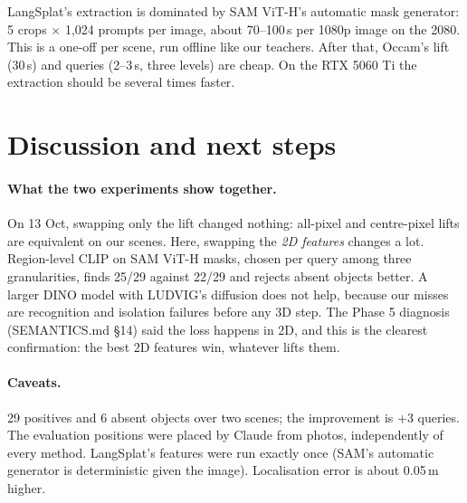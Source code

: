 \documentclass[11pt,a4paper]{article}
\begin{document}
\noindent LangSplat's extraction is dominated by SAM ViT-H's automatic mask generator: 5 crops $\times$ 1,024 prompts per
image, about 70--100\,s per 1080p image on the 2080. This is a one-off per scene, run offline like our teachers. After
that, Occam's lift (30\,s) and queries (2--3\,s, three levels) are cheap. On the RTX 5060 Ti the extraction should be
several times faster.

\section{Discussion and next steps}
\paragraph{What the two experiments show together.} On 13 Oct, swapping only the lift changed nothing: all-pixel and
centre-pixel lifts are equivalent on our scenes. Here, swapping the \emph{2D features} changes a lot. Region-level CLIP on
SAM ViT-H masks, chosen per query among three granularities, finds 25/29 against 22/29 and rejects absent objects better.
A larger DINO model with LUDVIG's diffusion does not help, because our misses are recognition and isolation failures
before any 3D step. The Phase 5 diagnosis (SEMANTICS.md \S14) said the loss happens in 2D, and this is the clearest
confirmation: the best 2D features win, whatever lifts them.

\paragraph{Caveats.} 29 positives and 6 absent objects over two scenes; the improvement is +3 queries. The
evaluation positions were placed by Claude from photos, independently of every method. LangSplat's features were run
exactly once (SAM's automatic generator is deterministic given the image). Localisation error is about 0.05\,m higher.
\end{document}
